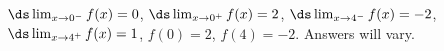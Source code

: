 {$\ds \lim_{x\to 0^-} f(x)=0$, \quad $\ds \lim_{x\to 0^+} f(x)=2$, \quad $\ds \lim_{x\to 4^-} f(x)=-2$, \quad $\ds \lim_{x\to 4^+} f(x)=1$, \quad $f(0)=2$, \quad $f(4)=-2$.}
{Answers will vary.}
